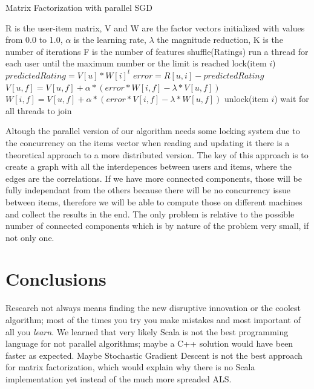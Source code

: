 \documentclass{sig-alternate-05-2015}
\begin{document}
\begin{algorithm}
    \caption{Matrix Factorization with parallel SGD}

    \begin{algorithmic}[1]
        \Require
            \Statex R is the user-item matrix,
            \Statex V and W are the factor vectors initialized with values from 0.0 to 1.0,
            \Statex $\alpha$ is the learning rate,
            \Statex $\lambda$ the magnitude reduction,
            \Statex K is the number of iterations
            \Statex F is the number of features
    \State shuffle(Ratings)
        \State run a thread for each user until the maximum number or the limit is reached
                \State lock(item $i$)
                \State $predictedRating = V[u] * W[i]^{t}$
                \State $error = R[u,i] - predictedRating$
                        \State $V[u,f] = V[u,f] + \alpha * (error * W[i,f] - \lambda * V[u,f])$
                        \State $W[i,f] = V[u,f] + \alpha * (error * V[i,f] - \lambda * W[u,f])$
                    \EndFor
                \State unlock(item $i$)
            \EndFor
        \EndFor
    \State wait for all threads to join
    \EndFor
    \end{algorithmic}
\end{algorithm}

Altough the parallel version of our algorithm needs some locking system
due to the concurrency on the items vector when reading and updating it
there is a theoretical approach to a more distributed version. The key
of this approach is to create a graph with all the interdepences between
users and items, where the edges are the correlations. If we have
more connected components, those will be fully independant from the others
because there will be no concurrency issue between items, therefore we
will be able to compute those on different machines and collect the results in the end.
The only problem is relative to the possible number of connected components which
is by nature of the problem very small, if not only one.




\section{Conclusions}
Research not always means finding the new disruptive innovation
or the coolest algorithm; most of the times you try
you make mistakes and most important of all you \textit{learn}.
We learned that very likely Scala is not the best programming language
for not parallel algorithms; maybe a C++ solution would have been faster as
expected. Maybe Stochastic Gradient Descent is not the best approach for matrix
factorization, which would explain why there is no Scala implementation yet
instead of the much more spreaded ALS.
\end{document}
